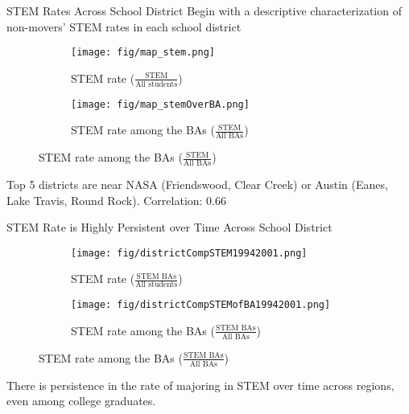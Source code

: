 \documentclass[aspectratio=169,xcolor=dvipsnames]{beamer}
\begin{document}
\begin{frame}{STEM Rates Across School District}\label{}
Begin with a descriptive characterization of non-movers’ STEM rates in each school district \vspace{-0.2cm}
    \begin{figure}[H]
    \centering {}
	\begin{subfigure}[t]{0.45\textwidth}
        \centering
    		\caption{STEM rate ($\frac{\text{STEM}}{\text{All students}}$)}
    		\texttt{[image: fig/map\_stem.png]}
	\end{subfigure}%
	\begin{subfigure}[t]{0.45\textwidth}
	    \centering
    		\caption{STEM rate among the BAs ($\frac{\text{STEM}}{\text{All BAs}}$)}
    		\texttt{[image: fig/map\_stemOverBA.png]}
	\end{subfigure}
	\par\smallskip
    \end{figure}
Top 5 districts are near NASA (Friendswood, Clear Creek) or Austin (Eanes, Lake Travis, Round Rock). Correlation: 0.66
\end{frame}

\begin{frame}{STEM Rate is Highly Persistent over Time Across School District}\label{}
    \begin{figure}[H]
    \centering
	\begin{subfigure}[t]{0.45\textwidth}
        \centering
    		\caption{STEM rate ($\frac{\text{STEM BAs}}{\text{All students}}$)}
    		\texttt{[image: fig/districtCompSTEM19942001.png]}
	\end{subfigure}%
        \pause
	\begin{subfigure}[t]{0.45\textwidth}
	    \centering
    		\caption{STEM rate among the BAs ($\frac{\text{STEM BAs}}{\text{All BAs}}$)}
    		\texttt{[image: fig/districtCompSTEMofBA19942001.png]}
	\end{subfigure}
	\par\smallskip
    \end{figure}
    There is persistence in the rate of majoring in STEM over time across regions, even among college graduates.
\end{frame}
\end{document}
